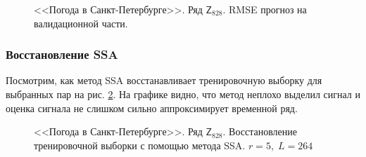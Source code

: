 \documentclass[specialist,
               substylefile = spbu.rtx,
               subf,href,colorlinks=true, 12p]{disser}
\begin{document}
\begin{figure}[H]
	\captionsetup{justification=centering}
	\caption{<<Погода в Санкт-Петербурге>>. Ряд $\mathsf{Z}_{828}$. RMSE прогноз на валидационной части.}
	\label{weather_ssa_forecast}
\end{figure}

\subsubsection{Восстановление SSA}

Посмотрим, как метод SSA восстанавливает тренировочную выборку для выбранных пар на рис. \ref{weather_rec}. На графике видно, что метод неплохо выделил сигнал и оценка сигнала не слишком сильно аппроксимирует временной ряд.

\begin{figure}[H]
	\captionsetup{justification=centering}
	\caption{<<Погода в Санкт-Петербурге>>. Ряд $\mathsf{Z}_{828}$. Восстановление тренировочной выборки с помощью метода SSA. $r = 5, \; L = 264$}
	\label{weather_rec}
\end{figure}
\end{document}
